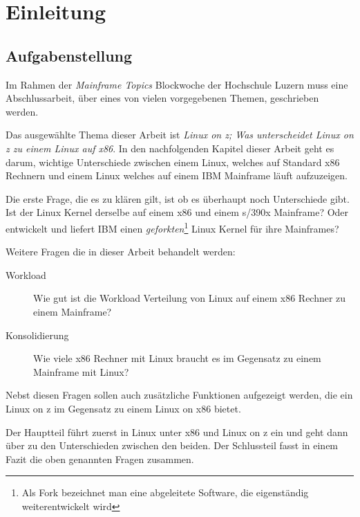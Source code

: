 \chapter{Einleitung}
\label{cha:Einleitung}

\section{Aufgabenstellung}

Im Rahmen der \textit{Mainframe Topics} Blockwoche der Hochschule Luzern muss eine Abschlussarbeit,
über eines von vielen vorgegebenen Themen, geschrieben werden.

Das ausgewählte Thema dieser Arbeit ist \textit{Linux on z; Was unterscheidet Linux on z zu einem Linux auf x86}.
In den nachfolgenden Kapitel dieser Arbeit geht es darum, wichtige Unterschiede zwischen einem Linux, welches auf Standard x86 Rechnern und einem Linux welches auf einem IBM Mainframe läuft aufzuzeigen.

Die erste Frage, die es zu klären gilt, ist ob es überhaupt noch Unterschiede gibt. Ist der Linux Kernel derselbe auf einem x86 und einem s/390x Mainframe? Oder entwickelt und liefert IBM einen \textit{geforkten}\footnote{Als Fork bezeichnet man eine abgeleitete Software, die eigenständig weiterentwickelt wird} Linux Kernel für ihre Mainframes?

Weitere Fragen die in dieser Arbeit behandelt werden:
\begin{description}
    \item[Workload]{Wie gut ist die Workload Verteilung von Linux auf einem x86 Rechner zu einem Mainframe?}
    \item[Konsolidierung]{Wie viele x86 Rechner mit Linux braucht es im Gegensatz zu einem Mainframe mit Linux?}
\end{description}

Nebst diesen Fragen sollen auch zusätzliche Funktionen aufgezeigt werden, die ein Linux on z im Gegensatz zu einem Linux on x86 bietet.

Der Hauptteil führt zuerst in Linux unter x86 und Linux on z ein und geht dann über zu den Unterschieden zwischen den beiden.
Der Schlussteil fasst in einem Fazit die oben genannten Fragen zusammen.
